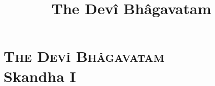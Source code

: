 \documentclass[12pt]{book}
\title{The Dev\^i Bh\^agavatam}
\begin{document}
\part{{\scshape\large The Dev\^i Bh\^agavatam}\\Skandha I}




















\end{document}
